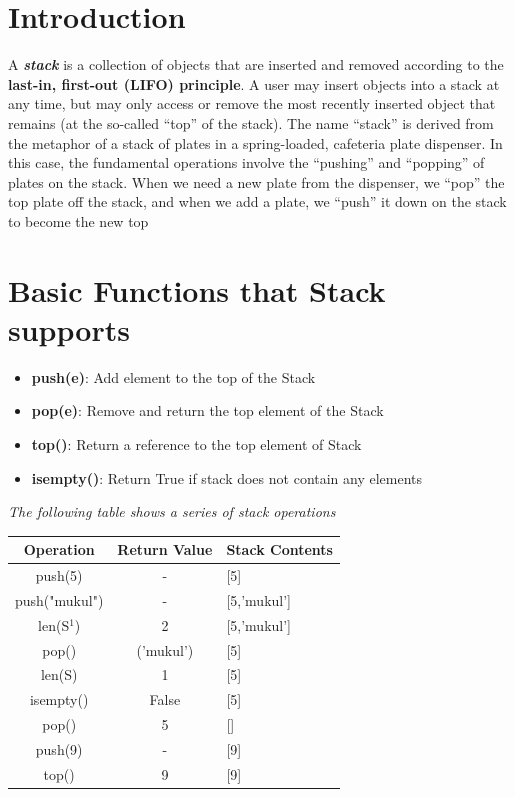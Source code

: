 \documentclass[a4paper,12pt]{report}
\begin{document}
\section{Introduction}
A \textbf{\textit{stack}} is a collection of objects that are inserted and removed according to the
\textbf{last-in, first-out (LIFO) principle}. A user may insert objects into a stack at any
time, but may only access or remove the most recently inserted object that remains
(at the so-called “top” of the stack). The name “stack” is derived from the metaphor
of a stack of plates in a spring-loaded, cafeteria plate dispenser. In this case, the
fundamental operations involve the “pushing” and “popping” of plates on the stack.
When we need a new plate from the dispenser, we “pop” the top plate off the stack,
and when we add a plate, we “push” it down on the stack to become the new top
\section{Basic Functions that Stack supports}
\begin{itemize}
	\item \textbf{push(e)}: Add element to the top of the Stack
	\item \textbf{pop(e)}: Remove and return the top element of the Stack
	\item \textbf{top()}: Return a reference to the top element of Stack
	\item \textbf{isempty()}: Return True if stack does not contain any
		elements
\end{itemize}
\textit{The following table shows a series of stack operations}\\
\begin{center}
\begin{tabular}{|c|c|l|}
	\hline
	\textbf{Operation} & \textbf{Return Value} & \textbf{Stack Contents}\\
	\hline
	push(5) & - & [5]\\
	push("mukul") & - & [5,'mukul']\\
	len(S$^1$) & 2 & [5,'mukul']\\
	pop() & ('mukul') & [5]\\
	len(S) & 1 & [5]\\
	isempty() & False & [5]\\
	pop() & 5 & []\\
	push(9) & - & [9]\\
	top() & 9 & [9]\\
	\hline
\end{tabular}
\end{center}
\end{document}
